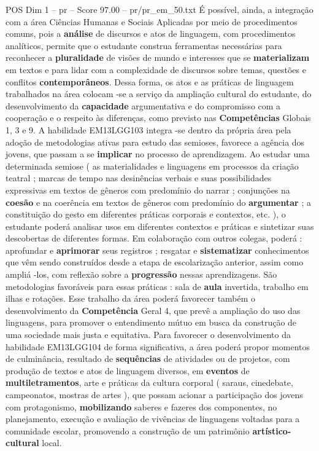 \begin{textsample}{POS Dim 1 – pr – Score 97.00 – pr/pr\_em\_50.txt}
É possível, ainda, a integração com a área Ciências Humanas e Sociais Aplicadas por meio de procedimentos comuns, pois a \textbf{análise} de discursos e atos de linguagem, com procedimentos analíticos, permite que o estudante construa ferramentas necessárias para reconhecer a \textbf{pluralidade} de visões de mundo e interesses que se \textbf{materializam} em textos e para lidar com a complexidade de discursos sobre temas, questões e conflitos \textbf{contemporâneos}.
Dessa forma, os atos e as práticas de linguagem trabalhados na área colocam -se a serviço da ampliação cultural do estudante, do desenvolvimento da \textbf{capacidade} argumentativa e do compromisso com a cooperação e o respeito às diferenças, como previsto nas \textbf{Competências} Globais 1, 3 e 9.
A habilidade EM13LGG103 integra -se dentro da própria área pela adoção de metodologias ativas para estudo das semioses, favorece a agência dos jovens, que passam a se \textbf{implicar} no processo de aprendizagem.
Ao estudar uma determinada semiose ( as materialidades e linguagens em processos da criação teatral ; marcas de tempo nas desinências verbais e suas possibilidades expressivas em textos de gêneros com predomínio do narrar ; conjunções na \textbf{coesão} e na coerência em textos de gêneros com predomínio do \textbf{argumentar} ; a constituição do gesto em diferentes práticas corporais e contextos, etc. ), o estudante poderá analisar usos em diferentes contextos e práticas e sintetizar suas descobertas de diferentes formas.
Em colaboração com outros colegas, poderá : aprofundar e \textbf{aprimorar} seus registros ; resgatar e \textbf{sistematizar} conhecimentos que vêm sendo construídos desde a etapa de escolarização anterior, assim como ampliá -los, com reflexão sobre a \textbf{progressão} nessas aprendizagens.
São metodologias favoráveis para essas práticas : sala de \textbf{aula} invertida, trabalho em ilhas e rotações.
Esse trabalho da área poderá favorecer também o desenvolvimento da \textbf{Competência} Geral 4, que prevê a ampliação do uso das linguagens, para promover o entendimento mútuo em busca da construção de uma sociedade mais justa e equitativa.
Para favorecer o desenvolvimento da habilidade EM13LGG104 de forma significativa, a área poderá propor momentos de culminância, resultado de \textbf{sequências} de atividades ou de projetos, com produção de textos e atos de linguagem diversos, em \textbf{eventos} de \textbf{multiletramentos}, arte e práticas da cultura corporal ( saraus, cinedebate, campeonatos, mostras de artes ), que possam acionar a participação dos jovens com protagonismo, \textbf{mobilizando} saberes e fazeres dos componentes, no planejamento, execução e avaliação de vivências de linguagens voltadas para a comunidade escolar, promovendo a construção de um patrimônio \textbf{artístico-cultural} local.

\end{textsample}
